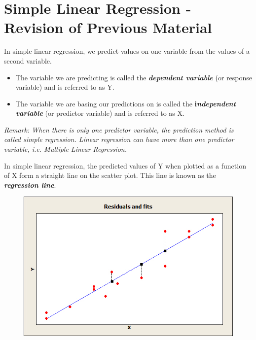 \documentclass[residuals.tex]{subfiles}
\begin{document}
	\large
\section*{Simple Linear Regression - Revision of Previous Material}	
In simple linear regression, we predict values on one variable from the values of a second variable. 

\begin{itemize}
	\item The variable we are predicting is called the \textbf{\textit{dependent variable}} (or response variable) and is referred to as Y. 
	
	\item The variable we are basing our predictions on is called the \textbf{i\textit{ndependent variable}} (or predictor variable) and is referred to as X.
\end{itemize} \textit{
\noindent Remark: When there is only one predictor variable, the prediction method is called simple regression. Linear regression can have more than one predictor variable, i.e. Multiple Linear Regression.}

\bigskip 
\noindent In simple linear regression, the predicted values of Y when plotted as a function of X form a straight line on the scatter plot. This line is known as the \textbf{\textit{regression line}}. 

\begin{figure}[h!]
	\centering
	\includegraphics[width=0.9\linewidth]{resids1}
	\caption{}
	\label{fig:resids1}
\end{figure}
\end{document}
